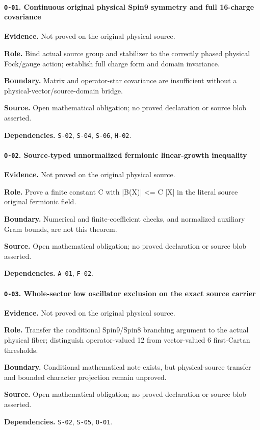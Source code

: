 \paragraph{\texttt{O-01}. Continuous original physical Spin9 symmetry and full 16-charge covariance}
\noindent\textbf{Evidence.} Not proved on the original physical source.
\par\noindent\textbf{Role.} Bind actual source group and stabilizer to the correctly phased physical Fock/gauge action; establish full charge form and domain invariance.
\par\noindent\textbf{Boundary.} Matrix and operator-star covariance are insufficient without a physical-vector/source-domain bridge.
\par\noindent\textbf{Source.} Open mathematical obligation; no proved declaration or source blob asserted.
\par\noindent\textbf{Dependencies.} \texttt{S-02}, \texttt{S-04}, \texttt{S-06}, \texttt{H-02}.
\medskip

\paragraph{\texttt{O-02}. Source-typed unnormalized fermionic linear-growth inequality}
\noindent\textbf{Evidence.} Not proved on the original physical source.
\par\noindent\textbf{Role.} Prove a finite constant C with |B(X)| <= C |X| in the literal source original fermionic field.
\par\noindent\textbf{Boundary.} Numerical and finite-coefficient checks, and normalized auxiliary Gram bounds, are not this theorem.
\par\noindent\textbf{Source.} Open mathematical obligation; no proved declaration or source blob asserted.
\par\noindent\textbf{Dependencies.} \texttt{A-01}, \texttt{F-02}.
\medskip

\paragraph{\texttt{O-03}. Whole-sector low oscillator exclusion on the exact source carrier}
\noindent\textbf{Evidence.} Not proved on the original physical source.
\par\noindent\textbf{Role.} Transfer the conditional Spin9/Spin8 branching argument to the actual physical fiber; distinguish operator-valued 12 from vector-valued 6 first-Cartan thresholds.
\par\noindent\textbf{Boundary.} Conditional mathematical note exists, but physical-source transfer and bounded character projection remain unproved.
\par\noindent\textbf{Source.} Open mathematical obligation; no proved declaration or source blob asserted.
\par\noindent\textbf{Dependencies.} \texttt{S-02}, \texttt{S-05}, \texttt{O-01}.
\medskip

